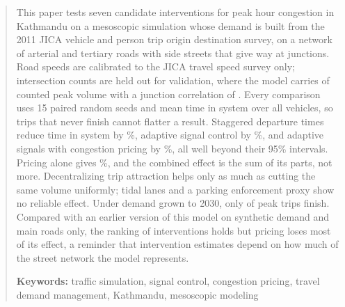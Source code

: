 \begin{abstract}
This paper tests seven candidate interventions for peak hour congestion in Kathmandu on a
mesoscopic simulation whose demand is built from the 2011 JICA vehicle and person trip origin
destination survey, on a network of arterial and tertiary roads with side streets that give way
at junctions. Road speeds are calibrated to the JICA travel speed survey only; intersection counts
are held out for validation, where the model carries \ValShare{} of counted peak volume with a
junction correlation of \ValCorr. Every comparison uses 15 paired random seeds and mean time in
system over all vehicles, so trips that never finish cannot flatter a result. Staggered departure
times reduce time in system by \HSixTisMag\%, adaptive signal control by \HOneTisMag\%, and
adaptive signals with congestion pricing by \HThreeTisMag\%, all well beyond their 95\% intervals.
Pricing alone gives \HTwoTisMag\%, and the combined effect is the sum of its parts, not more.
Decentralizing trip attraction helps only as much as cutting the same volume uniformly; tidal
lanes and a parking enforcement proxy show no reliable effect. Under demand grown to 2030, only
\ProjThirtyComp{} of peak trips finish. Compared with an earlier version of this model on synthetic
demand and main roads only, the ranking of interventions holds but pricing loses most of its
effect, a reminder that intervention estimates depend on how much of the street network the model
represents.

\medskip\noindent\textbf{Keywords:} traffic simulation, signal control, congestion pricing, travel
demand management, Kathmandu, mesoscopic modeling
\end{abstract}
